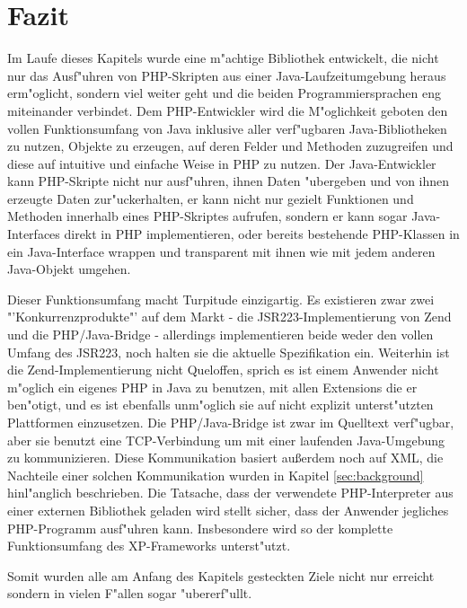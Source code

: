\section{Fazit}
\label{sec:chap1:fazit}

Im Laufe dieses Kapitels wurde eine m"achtige Bibliothek entwickelt, die nicht nur das Ausf"uhren von
PHP-Skripten aus einer Java-Laufzeitumgebung heraus erm"oglicht, sondern viel weiter geht und die beiden
Programmiersprachen eng miteinander verbindet. Dem PHP-Entwickler wird die M"oglichkeit geboten den
vollen Funktionsumfang von Java inklusive aller verf"ugbaren Java-Bibliotheken zu nutzen, Objekte zu erzeugen,
auf deren Felder und Methoden zuzugreifen und diese auf intuitive und einfache Weise in PHP zu nutzen.
Der Java-Entwickler kann PHP-Skripte nicht nur ausf"uhren, ihnen Daten "ubergeben und von ihnen erzeugte
Daten zur"uckerhalten, er kann nicht nur gezielt Funktionen und Methoden innerhalb eines PHP-Skriptes
aufrufen, sondern er kann sogar Java-Interfaces direkt in PHP implementieren, oder bereits bestehende PHP-Klassen
in ein Java-Interface wrappen und transparent mit ihnen wie mit jedem anderen Java-Objekt umgehen.

Dieser Funktionsumfang macht Turpitude einzigartig. Es existieren zwar zwei "'Konkurrenzprodukte"' auf dem
Markt - die JSR223-Implementierung von Zend und die PHP/Java-Bridge \cite{BRIDGEHP} - allerdings implementieren
beide weder den vollen Umfang des JSR223, noch halten sie die aktuelle Spezifikation ein. Weiterhin ist die
Zend-Implementierung nicht Queloffen, sprich es ist einem Anwender nicht m"oglich ein eigenes PHP in Java
zu benutzen, mit allen Extensions die er ben"otigt, und es ist ebenfalls unm"oglich sie auf nicht explizit
unterst"utzten Plattformen einzusetzen. Die PHP/Java-Bridge ist zwar im Quelltext verf"ugbar, aber sie
benutzt eine TCP-Verbindung um mit einer laufenden Java-Umgebung zu kommunizieren. Diese Kommunikation
basiert au\ss erdem noch auf XML, die Nachteile einer solchen Kommunikation wurden in Kapitel \ref{sec:background}
hinl"anglich beschrieben. Die Tatsache, dass der verwendete PHP-Interpreter aus einer externen Bibliothek
geladen wird stellt sicher, dass der Anwender jegliches PHP-Programm ausf"uhren kann. Insbesondere
wird so der komplette Funktionsumfang des XP-Frameworks unterst"utzt.

Somit wurden alle am Anfang des Kapitels gesteckten Ziele nicht nur erreicht sondern in vielen F"allen sogar
"ubererf"ullt.

